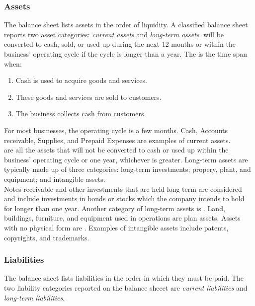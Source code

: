 \documentclass{article}
\begin{document}
\subsubsection{Assets}

The balance sheet lists assets in the order of liquidity. A classified balance sheet reports two asset categories: \emph{current assets} and \emph{long-term assets}.  will be converted to cash, sold, or used up during the next 12 months or within the business' operating cycle if the cycle is longer than a year. The  is the time span when: 
\begin{enumerate}
  \item Cash is used to acquire goods and services.
  \item These goods and services are sold to customers. 
  \item The business collects cash from customers. 
\end{enumerate}

For most businesses, the operating cycle is a few months. Cash, Accounts receivable, Supplies, and Prepaid Expenses are examples of current assets. \\ 

 are all the assets that will not be converted to cash or used up within the business' operating cycle or one year, whichever is greater. Long-term assets are typically made up of three categories: long-term investments; propery, plant, and equipment; and intangible assets. \\ 

Notes receivable and other investments that are held long-term are considered  and include investments in bonds or stocks which the company intends to hold for longer than one year. Another category of long-term assets is . Land, buildings, furniture, and equipment used in operations are plan assets. Assets with no physical form are . Examples of intangible assets include patents, copyrights, and trademarks. 

\subsubsection{Liabilities}

The balance sheet lists liabilities in the order in which they must be paid. The two liability categories reported on the balance sheeet are \emph{current liabilities} and \emph{long-term liabilities}. \\ 
\end{document}
